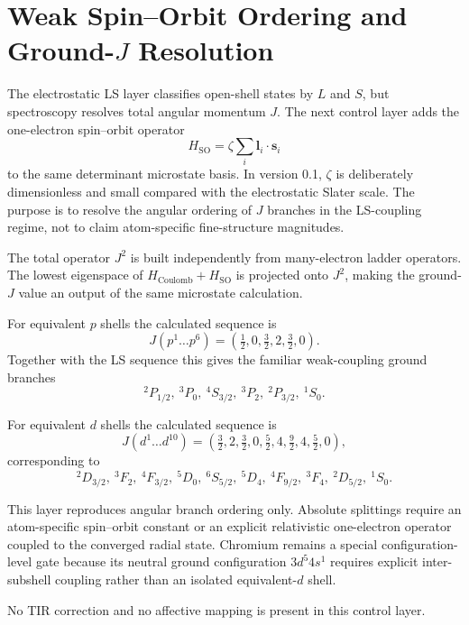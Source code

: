 \section{Weak Spin--Orbit Ordering and Ground-$J$ Resolution}

The electrostatic LS layer classifies open-shell states by $L$ and $S$, but spectroscopy resolves total angular momentum $J$.  The next control layer adds the one-electron spin--orbit operator
\[
H_{\mathrm{SO}}=\zeta\sum_i \mathbf l_i\cdot\mathbf s_i
\]
to the same determinant microstate basis.  In version 0.1, $\zeta$ is deliberately dimensionless and small compared with the electrostatic Slater scale.  The purpose is to resolve the angular ordering of $J$ branches in the LS-coupling regime, not to claim atom-specific fine-structure magnitudes.

The total operator $J^2$ is built independently from many-electron ladder operators.  The lowest eigenspace of $H_{\mathrm{Coulomb}}+H_{\mathrm{SO}}$ is projected onto $J^2$, making the ground-$J$ value an output of the same microstate calculation.

For equivalent $p$ shells the calculated sequence is
\[
J(p^1\ldots p^6)=\left(\tfrac12,0,\tfrac32,2,\tfrac32,0\right).
\]
Together with the LS sequence this gives the familiar weak-coupling ground branches
\[
{}^2P_{1/2},\ {}^3P_0,\ {}^4S_{3/2},\ {}^3P_2,\ {}^2P_{3/2},\ {}^1S_0.
\]

For equivalent $d$ shells the calculated sequence is
\[
J(d^1\ldots d^{10})=\left(\tfrac32,2,\tfrac32,0,\tfrac52,4,\tfrac92,4,\tfrac52,0\right),
\]
corresponding to
\[
{}^2D_{3/2},\ {}^3F_2,\ {}^4F_{3/2},\ {}^5D_0,\ {}^6S_{5/2},\ {}^5D_4,\ {}^4F_{9/2},\ {}^3F_4,\ {}^2D_{5/2},\ {}^1S_0.
\]

This layer reproduces angular branch ordering only.  Absolute splittings require an atom-specific spin--orbit constant or an explicit relativistic one-electron operator coupled to the converged radial state.  Chromium remains a special configuration-level gate because its neutral ground configuration $3d^5 4s^1$ requires explicit inter-subshell coupling rather than an isolated equivalent-$d$ shell.

No TIR correction and no affective mapping is present in this control layer.
